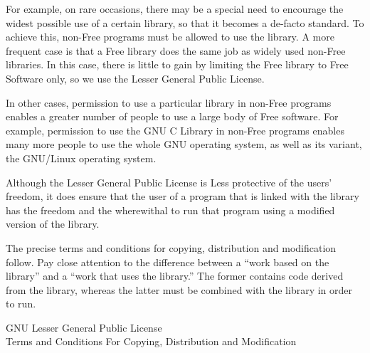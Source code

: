 \documentclass[11pt, letterpaper]{book}
\begin{document}
For example, on rare occasions, there may be a special need to encourage
the widest possible use of a certain library, so that it becomes a
de-facto standard. To achieve this, non-Free programs must be allowed to
use the library. A more frequent case is that a Free library does the
same job as widely used non-Free libraries. In this case, there is little
to gain by limiting the Free library to Free Software only, so we use the
Lesser General Public License.

In other cases, permission to use a particular library in non-Free
programs enables a greater number of people to use a large body of Free
software. For example, permission to use the GNU C Library in non-Free
programs enables many more people to use the whole GNU operating system,
as well as its variant, the GNU/Linux operating system.

Although the Lesser General Public License is Less protective of the
users' freedom, it does ensure that the user of a program that is linked
with the library has the freedom and the wherewithal to run that program
using a modified version of the library.

The precise terms and conditions for copying, distribution and
modification follow. Pay close attention to the difference between a
``work based on the library'' and a ``work that uses the library.''  The
former contains code derived from the library, whereas the latter must be
combined with the library in order to run.

\begin{center}
{\Large \sc GNU Lesser General Public License} \\
{\Large \sc Terms and Conditions For Copying, Distribution and
  Modification}
\end{center}
\end{document}
